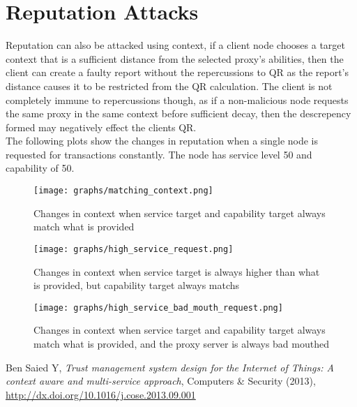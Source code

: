

    \section{Reputation Attacks}
        Reputation can also be attacked using context, if a client node chooses
        a target context that is a sufficient distance from the selected
        proxy's abilities, then the client can create a faulty report without
        the repercussions to QR as the report's distance causes it to be
        restricted from the QR calculation. The client is not completely immune
        to repercussions though, as if a non-malicious node requests the same
        proxy in the same context before sufficient decay, then the descrepency
        formed may negatively effect the clients QR\@. \\
        The following plots show the changes in reputation when a single node
        is requested for transactions constantly. The node has service level 50
        and capability of 50.
        \begin{figure}[H]
            \centering
            \texttt{[image: graphs/matching\_context.png]}
            \caption{Changes in context when service target and capability
            target always match what is provided}
        \end{figure}
        \begin{figure}[H]
            \centering
            \texttt{[image: graphs/high\_service\_request.png]}
            \caption{Changes in context when service target is always higher
            than what is provided, but capability target always matchs}
        \end{figure}
        \begin{figure}[H]
            \centering
            \texttt{[image: graphs/high\_service\_bad\_mouth\_request.png]}
            \caption{Changes in context when service target and capability
            target always match what is provided, and the proxy server is
            always bad mouthed}
        \end{figure}


    \begin{thebibliography}{9}
            Ben Saied Y,
            \textit{Trust management system design for the Internet of Things: A context aware and multi-service approach},
            Computers \& Security (2013),
            \url{http://dx.doi.org/10.1016/j.cose.2013.09.001}
    \end{thebibliography}

